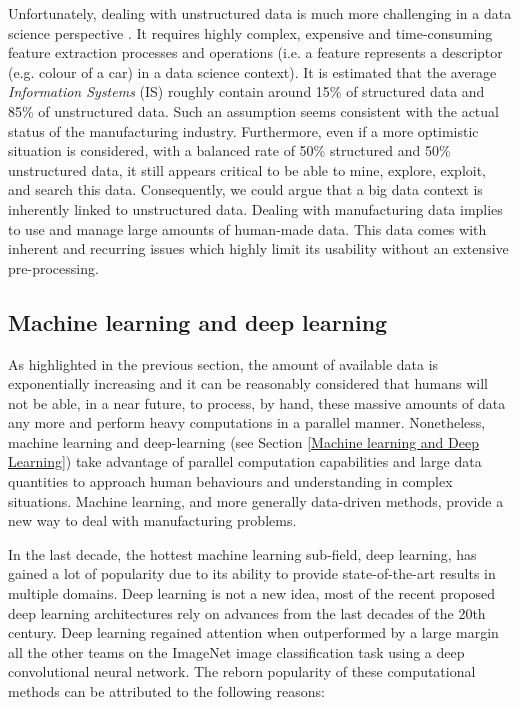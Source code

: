 Unfortunately, dealing with unstructured data is much more challenging in a data science perspective \citep{blumberg2003problem,sagiroglu2013big,buneman1997adding}. It requires highly complex, expensive and time-consuming feature extraction processes and operations (i.e. a feature represents a descriptor (e.g. colour of a car) in a data science context). It is estimated that the average \textit{Information Systems} (IS) roughly contain around 15\% of structured data and 85\% of unstructured data. Such an assumption seems consistent with the actual status of the manufacturing industry. Furthermore, even if a more optimistic situation is considered, with a balanced rate of 50\% structured and 50\% unstructured data, it still appears critical to be able to mine, explore, exploit, and search this data. Consequently, we could argue that a big data context is inherently linked to unstructured data.
Dealing with manufacturing data implies to use and manage large amounts of human-made data. This data comes with inherent and recurring issues which highly limit its usability without an extensive pre-processing.

\subsection{Machine learning and deep learning}

As highlighted in the previous section, the amount of available data is exponentially increasing and it can be reasonably considered that humans will not be able, in a near future, to process, by hand, these massive amounts of data any more and perform heavy computations in a parallel manner. Nonetheless, machine learning and deep-learning (see Section \ref{Machine learning and Deep Learning}) take advantage of parallel computation capabilities and large data quantities to approach human behaviours and understanding in complex situations. Machine learning, and more generally data-driven methods, provide a new way to deal with manufacturing problems. 

In the last decade, the hottest machine learning sub-field, deep learning, has gained a lot of popularity due to its ability to provide state-of-the-art results in multiple domains. Deep learning is not a new idea, most of the recent proposed deep learning architectures rely on advances from the last decades of the 20th century. Deep learning regained attention when \citet{krizhevsky2012imagenet} outperformed by a large margin all the other teams on the ImageNet \citep{deng2009imagenet} image classification task using a deep convolutional neural network. The reborn popularity of these computational methods can be attributed to the following reasons:

